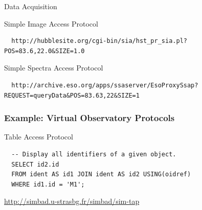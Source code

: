 \documentclass[fleqn]{beamer}
\begin{document}
\begin{section}{Data Acquisition}
\begin{frame}[containsverbatim]
Simple Image Access Protocol

\begin{lstlisting}
  http://hubblesite.org/cgi-bin/sia/hst_pr_sia.pl?POS=83.6,22.0&SIZE=1.0
\end{lstlisting}

Simple Spectra Access Protocol

\begin{lstlisting}
  http://archive.eso.org/apps/ssaserver/EsoProxySsap?REQUEST=queryData&POS=83.63,22&SIZE=1
\end{lstlisting}

\end{frame}

\begin{frame}[containsverbatim]\frametitle{Example: Virtual
    Observatory Protocols}

Table Access Protocol
\begin{lstlisting}
  -- Display all identifiers of a given object.
  SELECT id2.id
  FROM ident AS id1 JOIN ident AS id2 USING(oidref)
  WHERE id1.id = 'M1';
\end{lstlisting}

\url{http://simbad.u-strasbg.fr/simbad/sim-tap}

\end{frame}

\end{section}


\end{document}
